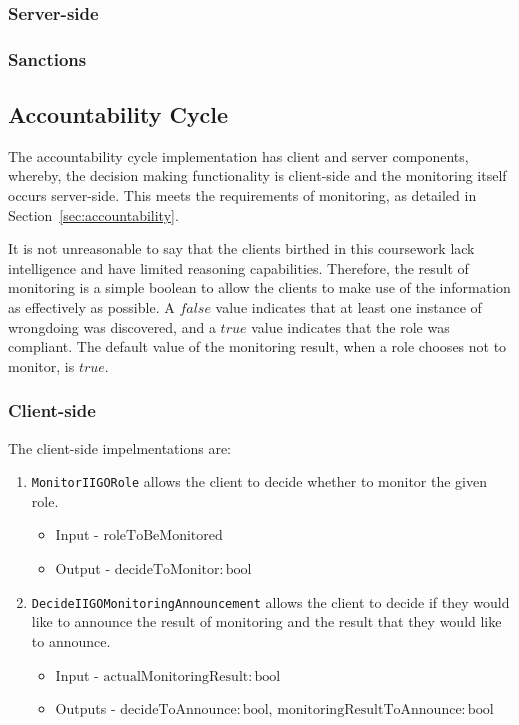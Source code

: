 \subsubsection{Server-side}

\subsubsection{Sanctions}
\subsection{Accountability Cycle}
The accountability cycle implementation has client and server components, whereby, the decision making functionality is client-side and the monitoring itself occurs server-side. This meets the requirements of monitoring, as detailed in Section~\ref{sec:accountability}.

It is not unreasonable to say that the clients birthed in this coursework lack intelligence and have limited reasoning capabilities. Therefore, the result of monitoring is a simple boolean to allow the clients to make use of the information as effectively as possible. A $false$ value indicates that at least one instance of wrongdoing was discovered, and a $true$ value indicates that the role was compliant. The default value of the monitoring result, when a role chooses not to monitor, is $true$.

\subsubsection{Client-side}
The client-side impelmentations are:
\begin{enumerate}
    \item \texttt{MonitorIIGORole} allows the client to decide whether to monitor the given role. 
    \begin{itemize}
        \item Input - $\mathrm{roleToBeMonitored}$
        \item Output - $\mathrm{decideToMonitor:bool}$
    \end{itemize} 
    \item \texttt{DecideIIGOMonitoringAnnouncement} allows the client to decide if they would like to announce the result of monitoring and the result that they would like to announce. 
    \begin{itemize}
        \item Input - $\mathrm{actualMonitoringResult:bool}$
        \item Outputs - $\mathrm{decideToAnnounce:bool}$, $\mathrm{monitoringResultToAnnounce:bool}$
    \end{itemize} 
\end{enumerate}
